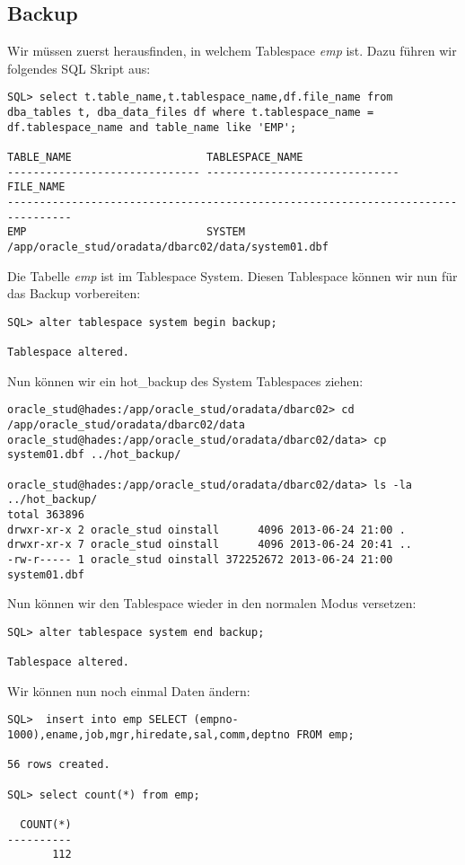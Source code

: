 \documentclass[11pt,a4paper,parskip=half]{scrartcl}
\begin{document}
\subsection{Backup}
Wir müssen zuerst herausfinden, in welchem Tablespace \emph{emp} ist. Dazu führen wir folgendes SQL Skript aus:

\begin{lstlisting}
SQL> select t.table_name,t.tablespace_name,df.file_name from dba_tables t, dba_data_files df where t.tablespace_name = df.tablespace_name and table_name like 'EMP';

TABLE_NAME                     TABLESPACE_NAME
------------------------------ ------------------------------
FILE_NAME
--------------------------------------------------------------------------------
EMP                            SYSTEM
/app/oracle_stud/oradata/dbarc02/data/system01.dbf
\end{lstlisting}

Die Tabelle \emph{emp} ist im Tablespace System. Diesen Tablespace können wir nun für das Backup vorbereiten:

\begin{lstlisting}
SQL> alter tablespace system begin backup;

Tablespace altered.
\end{lstlisting}

Nun können wir ein hot\_backup des System Tablespaces ziehen:
\begin{lstlisting}
oracle_stud@hades:/app/oracle_stud/oradata/dbarc02> cd /app/oracle_stud/oradata/dbarc02/data
oracle_stud@hades:/app/oracle_stud/oradata/dbarc02/data> cp system01.dbf ../hot_backup/

oracle_stud@hades:/app/oracle_stud/oradata/dbarc02/data> ls -la ../hot_backup/
total 363896
drwxr-xr-x 2 oracle_stud oinstall      4096 2013-06-24 21:00 .
drwxr-xr-x 7 oracle_stud oinstall      4096 2013-06-24 20:41 ..
-rw-r----- 1 oracle_stud oinstall 372252672 2013-06-24 21:00 system01.dbf
\end{lstlisting}

Nun können wir den Tablespace wieder in den normalen Modus versetzen:

\begin{lstlisting}
SQL> alter tablespace system end backup;

Tablespace altered.
\end{lstlisting}

Wir können nun noch einmal Daten ändern:

\begin{lstlisting}
SQL>  insert into emp SELECT (empno-1000),ename,job,mgr,hiredate,sal,comm,deptno FROM emp;

56 rows created.

SQL> select count(*) from emp;

  COUNT(*)
----------
       112
\end{lstlisting}
\end{document}
